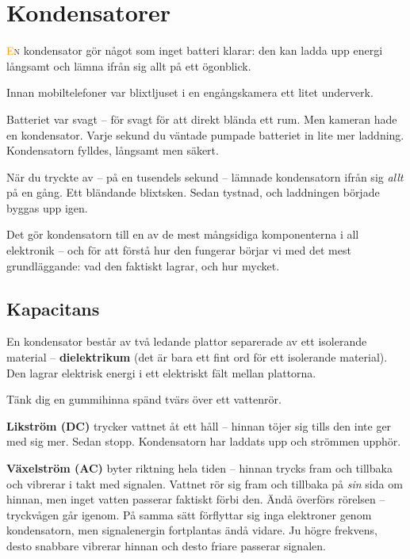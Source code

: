 \documentclass[a4paper,11pt,twoside]{book}
\newcommand{\emoji}[1]{{\emojifont #1}}
\begin{document}
\section{Kondensatorer}

\lettrine[lines=2]{\textcolor{orange}{E}}{n} kondensator gör något som inget batteri klarar: den kan ladda upp energi långsamt och lämna ifrån sig allt på ett ögonblick.

\begin{storybox}[{\emoji{⚡} Blixten och kameran}]
Innan mobiltelefoner var blixtljuset i en engångskamera 
ett litet underverk.

Batteriet var svagt -- för svagt för att direkt blända 
ett rum. Men kameran hade en kondensator. Varje sekund 
du väntade pumpade batteriet in lite mer laddning. 
Kondensatorn fylldes, långsamt men säkert.

När du tryckte av -- på en tusendels sekund -- lämnade 
kondensatorn ifrån sig \emph{allt} på en gång. Ett 
bländande blixtsken. Sedan tystnad, och laddningen 
började byggas upp igen.
\end{storybox}

Det gör kondensatorn till en av de mest mångsidiga komponenterna i all elektronik -- och för att förstå hur den fungerar börjar vi med det mest grundläggande: vad den faktiskt lagrar, och hur mycket.

\subsection{Kapacitans}

En kondensator består av två ledande plattor separerade av ett isolerande material -- \textbf{dielektrikum} (det är bara ett fint ord för ett isolerande material). Den lagrar elektrisk energi i ett elektriskt fält mellan plattorna.

\begin{examplebox}[title={\emoji{💡} Gummihinna-analogin}]
Tänk dig en gummihinna spänd tvärs över ett vattenrör.

\textbf{Likström (DC)} trycker vattnet åt ett håll -- hinnan töjer sig tills den inte ger med sig mer. Sedan stopp. Kondensatorn har laddats upp och strömmen upphör.

\textbf{Växelström (AC)} byter riktning hela tiden -- hinnan trycks fram och tillbaka och vibrerar i takt med signalen. Vattnet rör sig fram och tillbaka på \emph{sin} sida om hinnan, men inget vatten passerar faktiskt förbi den. Ändå överförs rörelsen -- tryckvågen går igenom. På samma sätt förflyttar sig inga elektroner genom kondensatorn, men signalenergin fortplantas ändå vidare. Ju högre frekvens, desto snabbare vibrerar hinnan och desto friare passerar signalen.
\end{examplebox}
\end{document}
